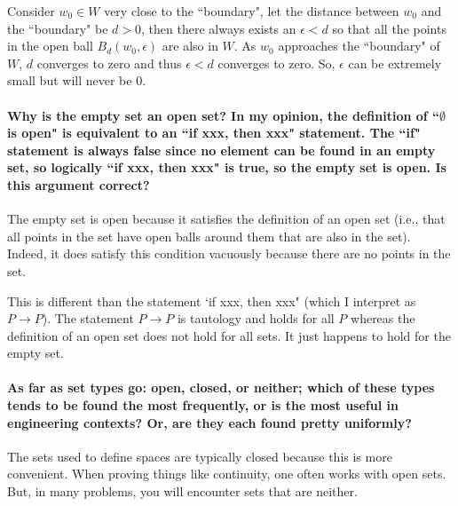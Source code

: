 \documentclass[10pt,english]{article}
\begin{document}
Consider $w_0 \in W$ very close to the ``boundary", let the distance between $w_0$ and the ``boundary" be $d > 0$, then there always exists an $\epsilon < d$ so that all the points in the open ball $B_d(w_0, \epsilon)$ are also in $W$. As $w_0$ approaches the ``boundary" of $W$, $d$ converges to zero and thus $\epsilon < d$ converges to zero. So, $\epsilon$ can be extremely small but will never be 0.

%



\paragraph{Why is the empty set an open set? In my opinion, the definition of ``$\emptyset$ is open" is equivalent to an ``if xxx, then xxx" statement. The ``if" statement is always false since no element can be found in an empty set, so logically ``if xxx, then xxx" is true, so the empty set is open. Is this argument correct?}

The empty set is open because it satisfies the definition of an open set (i.e., that all points in the set have open balls around them that are also in the set).
Indeed, it does satisfy this condition vacuously because there are no points in the set.

This is different than the statement `if xxx, then xxx" (which I interpret as $P\to P$).
The statement $P\to P$ is tautology and holds for all $P$ whereas the definition of an open set does not hold for all sets.
It just happens to hold for the empty set.


\paragraph{As far as set types go: open, closed, or neither; which of these types tends to be found the most frequently, or is the most useful in engineering contexts? Or, are they each found pretty uniformly?}

The sets used to define spaces are typically closed because this is more convenient.
When proving things like continuity, one often works with open sets.
But, in many problems, you will encounter sets that are neither.
\end{document}
